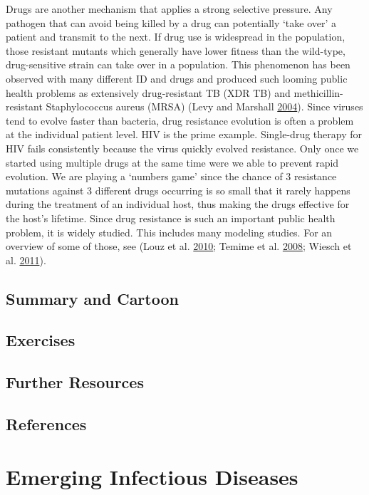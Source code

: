 \documentclass[]{book}
\theoremstyle{definition}
\theoremstyle{definition}
\theoremstyle{definition}
\theoremstyle{remark}
\begin{document}
Drugs are another mechanism that applies a strong selective pressure.
Any pathogen that can avoid being killed by a drug can potentially `take
over' a patient and transmit to the next. If drug use is widespread in
the population, those resistant mutants which generally have lower
fitness than the wild-type, drug-sensitive strain can take over in a
population. This phenomenon has been observed with many different ID and
drugs and produced such looming public health problems as extensively
drug-resistant TB (XDR TB) and methicillin-resistant Staphylococcus
aureus (MRSA) (Levy and Marshall \protect\hyperlink{ref-levy04}{2004}).
Since viruses tend to evolve faster than bacteria, drug resistance
evolution is often a problem at the individual patient level. HIV is the
prime example. Single-drug therapy for HIV fails consistently because
the virus quickly evolved resistance. Only once we started using
multiple drugs at the same time were we able to prevent rapid evolution.
We are playing a `numbers game' since the chance of 3 resistance
mutations against 3 different drugs occurring is so small that it rarely
happens during the treatment of an individual host, thus making the
drugs effective for the host's lifetime. Since drug resistance is such
an important public health problem, it is widely studied. This includes
many modeling studies. For an overview of some of those, see (Louz et
al. \protect\hyperlink{ref-louz10}{2010}; Temime et al.
\protect\hyperlink{ref-temime08}{2008}; Wiesch et al.
\protect\hyperlink{ref-wiesch11}{2011}).

\section{Summary and Cartoon}\label{summary-and-cartoon-14}

\section{Exercises}\label{exercises-14}

\section{Further Resources}\label{further-resources-14}

\section{References}\label{references-15}

\chapter{Emerging Infectious
Diseases}\label{emerging-infectious-diseases}
\end{document}
